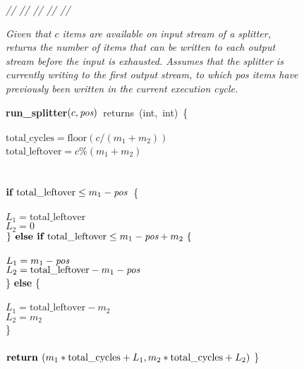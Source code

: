 \begin{figure}[t]
\begin{minipage}{0.1in}
\vspace{-1.75pt}
{\it // // // // //}
\end{minipage}
\begin{minipage}{3.23in}
{\it Given that $c$ items are available on input stream of a splitter,
  returns the number of items that can be written to each output stream
  before the input is exhausted.
  Assumes that the splitter is currently writing to the first output
  stream, to which \mbox{pos} items have previously been written in
  the current execution cycle.}
\end{minipage}
\mbox{\bf run\_splitter}$(c, \mbox{\it pos} )$~returns~(int,~int)~\{\\
\\
\tab$\mbox{total\_cycles} = \mbox{floor}(c/(m_1 + m_2))$\\
\tab$\mbox{total\_leftover} = c$\%$(m_1 + m_2)$\\
~ \\
\\
\tab$\mbox{\bf if~} \mbox{total\_leftover} \leq m_1 - \mbox{\it pos}$~\{\\
\tab{}\\
\tab\tab$L_1 = \mbox{total\_leftover}$\\
\tab\tab$L_2 = 0$\\
\tab$\} \mbox{\bf~else if~} \mbox{total\_leftover} \leq m_1-\mbox{\it pos} + m_2~\{$\\
\tab{}\\
\tab\tab$L_1 = m_1-\mbox{\it pos}$\\
\tab\tab$L_2 = \mbox{total\_leftover} - m_1-\mbox{\it pos}$\\
\tab\} \mbox{\bf else} \{\\
\tab{}\\
\tab\tab$L_1 = \mbox{total\_leftover} - m_2$\\
\tab\tab$L_2 = m_2$\\
\tab\}\\
~ \\ 
\tab$\mbox{\bf return~}(m_1*\mbox{total\_cycles} + L_1, m_2*\mbox{total\_cycles} + L_2)$
\}\\
~ \\

\end{figure}
